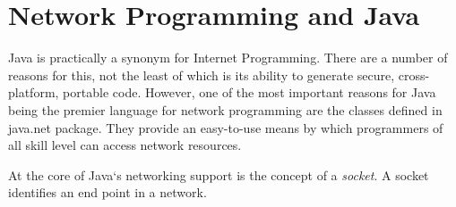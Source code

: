 
\section{Network Programming and Java}
Java is practically a synonym for Internet Programming. There are a number of reasons for this, not the least of which is its ability to generate secure, cross-platform, portable code. However, one of the most important reasons for Java being the premier language for network programming are the classes defined in java.net package. They provide an easy-to-use means by which programmers of all skill level can access network resources.

At the core of Java`s networking support is the concept of a \emph{socket}. A socket identifies an end point in a network.